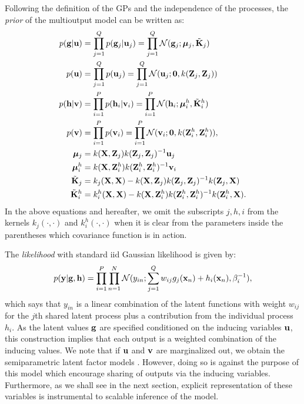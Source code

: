 Following the definition of the GPs and the independence of the processes, the \emph{prior} of the multioutput model can be written as:
\begin{align}
\label{eq:gu}
p(\mathbf{g} | \mathbf{u}) &= \prod_{j=1}^Q p(\mathbf{g}_j | \mathbf{u}_j) = \prod_{j=1}^Q \mathcal{N}(\mathbf{g}_j; \boldsymbol{\mu}_j, \tilde{\mathbf{K}}_j )\\
p(\mathbf{u}) &= \prod_{j=1}^Q p(\mathbf{u}_j) = \prod_{j=1}^Q \mathcal{N}(\mathbf{u}_j; \mathbf{0}, k(\mathbf{Z}_j, \mathbf{Z}_j)) \\
\label{eq:hv}
p(\mathbf{h} | \mathbf{v}) &= \prod_{i=1}^P p(\mathbf{h}_i | \mathbf{v}_i) = \prod_{i=1}^P \mathcal{N}(\mathbf{h}_i; \boldsymbol{\mu}^h_i, \tilde{\mathbf{K}}^h_i)\\
p(\mathbf{v}) &= \prod_{i=1}^P p(\mathbf{v}_i) = \prod_{i=1}^P \mathcal{N}(\mathbf{v}_i; \mathbf{0}, k(\mathbf{Z}^h_i, \mathbf{Z}^h_i)), \\
 \boldsymbol{\mu}_j &= k(\mathbf{X},\mathbf{Z}_j)k(\mathbf{Z}_j,\mathbf{Z}_j)^{-1}\mathbf{u}_j \\
\boldsymbol{\mu}^h_i &= k(\mathbf{X},\mathbf{Z}^h_i)k(\mathbf{Z}^h_i,\mathbf{Z}^h_i)^{-1}\mathbf{v}_i \\
\tilde{\mathbf{K}}_j &= k_j(\mathbf{X},\mathbf{X}) - k(\mathbf{X},\mathbf{Z}_j)k(\mathbf{Z}_j,\mathbf{Z}_j)^{-1}k(\mathbf{Z}_j,\mathbf{X}) \\
\tilde{\mathbf{K}}^h_i &= k^h_i(\mathbf{X},\mathbf{X}) - k(\mathbf{X},\mathbf{Z}^h_i)k(\mathbf{Z}^h_i,\mathbf{Z}^h_i)^{-1}k(\mathbf{Z}^h_i,\mathbf{X}).
\end{align}
In the above equations and hereafter, we omit the subscripts $j,h,i$ from the kernels $k_j(\cdot,\cdot)$ and $k^h_i(\cdot,\cdot)$ when it is clear from the parameters inside the parentheses which covariance function is in action. 

The \emph{likelihood} with standard iid Gaussian likelihood is given by:
\begin{align}
p(\mathbf{y} | \mathbf{g}, \mathbf{h} ) = \prod_{i=1}^P \prod_{n=1}^N \mathcal{N}( y_{in} ; \sum_{j=1}^Q w_{ij} g_j(\mathbf{x}_n) + h_i(\mathbf{x}_n), \beta_i^{-1}),
\end{align}
which says that $y_{in}$ is a linear combination of the latent functions with weight $w_{ij}$ for the $j$th shared latent process plus a contribution from the individual process $h_i$.
As the latent values $\mathbf{g}$ are specified conditioned on the inducing variables $\mathbf{u}$, this construction implies that each output is a weighted combination of the inducing values.
We note that if $\mathbf{u}$ and $\mathbf{v}$ are marginalized out, we obtain the semiparametric latent factor models \citep{teh-et-al-aistats-05,seeger2005semiparametric}.
However, doing so is against the purpose of this model which encourage sharing of outputs via the inducing variables.
Furthermore, as we shall see in the next section, explicit representation of these variables is instrumental to scalable inference of the model.

